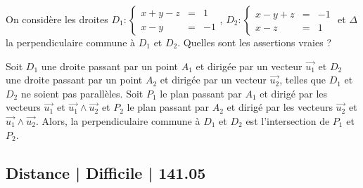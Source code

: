 \begin{question} 

On considère les droites $D_1 : \left\{\begin{array}{ccl}x+y-z&=&1\\x-y&=&-1 \end{array}\right.$,  
$D_2 : \left\{\begin{array}{ccl}x-y+z&=&-1\\x-z&=&1 \end{array}\right.$
 et $\Delta$ la perpendiculaire commune à $D_1$ et $D_2$. Quelles sont les assertions vraies ?
\begin{answers}





 
    
\end{answers}
\begin{explanations}
Soit $D_1$ une droite passant par un point $A_1$ et dirigée par un vecteur $\vec{u_1}$ et 
 $D_2$ une droite passant par un point $A_2$ et dirigée par un vecteur $\vec{u_2}$, telles que $D_1$ et $D_2$ ne soient pas parallèles. Soit $P_1$ le plan passant par $A_1$ et dirigé par les vecteurs $\vec{u_1}$ et $\vec{u_1} \wedge \vec{u_2}$ et 
 $P_2$ le plan passant par $A_2$ et dirigé par les vecteurs $\vec{u_2}$ et $\vec{u_1} \wedge \vec{u_2}$. Alors, la perpendiculaire commune à $D_1$ et $D_2$ est l'intersection de $P_1$ et $P_2$.
\end{explanations}

\end{question}


\subsection{Distance | Difficile | 141.05}


